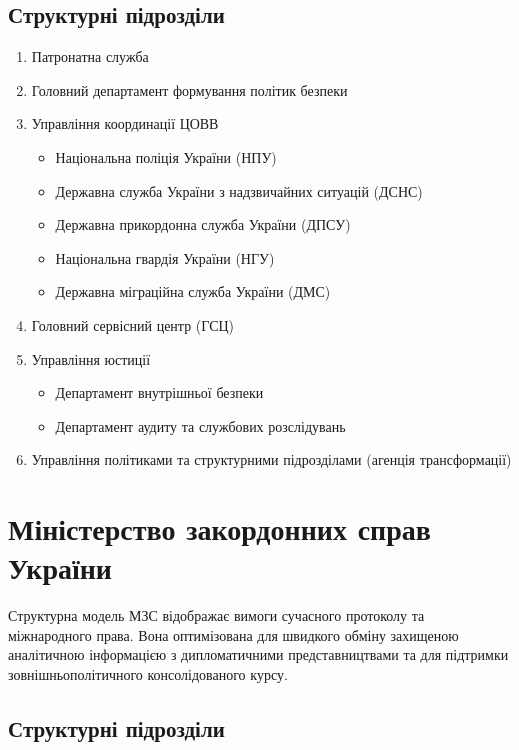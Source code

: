 \subsection*{Структурні підрозділи}

\begin{enumerate}
    \item Патронатна служба
    \item Головний департамент формування політик безпеки
    \item Управління координації ЦОВВ
    \begin{itemize}
        \item Національна поліція України (НПУ)
        \item Державна служба України з надзвичайних ситуацій (ДСНС)
        \item Державна прикордонна служба України (ДПСУ)
        \item Національна гвардія України (НГУ)
        \item Державна міграційна служба України (ДМС)
    \end{itemize}
    \item Головний сервісний центр (ГСЦ)
    \item Управління юстиції
    \begin{itemize}
        \item Департамент внутрішньої безпеки
        \item Департамент аудиту та службових розслідувань
    \end{itemize}
    \item Управління політиками та структурними підрозділами (агенція трансформації)
\end{enumerate}

\newpage
\section{Міністерство закордонних справ України}

Структурна модель МЗС відображає вимоги сучасного протоколу та міжнародного права. Вона оптимізована для швидкого обміну захищеною аналітичною інформацією з дипломатичними представництвами та для підтримки зовнішньополітичного консолідованого курсу.

\subsection*{Структурні підрозділи}

